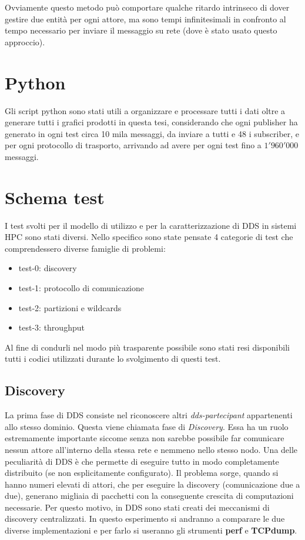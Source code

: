 Ovviamente questo metodo può comportare qualche ritardo intrinseco di dover gestire due entità per ogni attore, ma sono tempi infinitesimali in confronto al tempo necessario per inviare il messaggio su rete (dove è stato usato questo approccio).

\section{Python}
Gli script python sono stati utili a organizzare e processare tutti i dati oltre a generare tutti i grafici prodotti in questa tesi, considerando che ogni publisher ha generato in ogni test circa 10 mila messaggi, da inviare a tutti e 48 i subscriber, e per ogni protocollo di trasporto, arrivando ad avere per ogni test fino a $1'960'000$ messaggi. 


\section{Schema test}
I test svolti per il modello di utilizzo e per la caratterizzazione di DDS in sistemi HPC sono stati diversi. Nello specifico sono state pensate 4 categorie di test che comprendessero diverse famiglie di problemi:

\begin{itemize}
    \item test-0: discovery
    \item test-1: protocollo di comunicazione
    \item test-2: partizioni e wildcards
    \item test-3: throughput
\end{itemize}

Al fine di condurli nel modo più trasparente possibile sono stati resi disponibili~\cite{mygit} tutti i codici utilizzati durante lo svolgimento di questi test. %


\subsection{Discovery}
La prima fase di DDS consiste nel riconoscere altri \emph{dds-partecipant} appartenenti allo stesso dominio. Questa viene chiamata fase di \emph{ Discovery}. Essa ha un ruolo estremamente importante siccome senza non sarebbe possibile far comunicare nessun attore all'interno della stessa rete e nemmeno nello stesso nodo. Una delle peculiarità di DDS è che permette di eseguire tutto in modo completamente distribuito (se non esplicitamente configurato). Il problema sorge, quando si hanno numeri elevati di attori, che per eseguire la discovery (comunicazione due a due), generano migliaia di pacchetti con la conseguente crescita di  computazioni necessarie. %
Per questo motivo, in DDS sono stati creati dei meccanismi di discovery centralizzati. In questo esperimento si andranno a comparare le due diverse implementazioni e per farlo si useranno gli strumenti \textbf{perf} e \textbf{TCPdump}.

